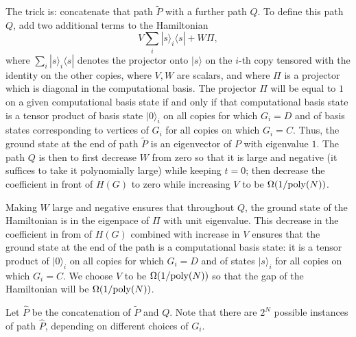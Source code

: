 \documentclass[letterpaper,onecolumn]{quantumarticle}
\newcommand{\poly}{{\rm poly}}
\begin{document}
The trick is: concatenate that path $\tilde P$ with a further path $Q$.  To define this path $Q$, add two additional terms to the Hamiltonian
$$V\sum_i |s\rangle_i\langle s| +W \Pi,$$
where $\sum_i |s\rangle_i\langle s|$ denotes the projector onto $|s\rangle$ on the $i$-th copy tensored with the identity on the other copies, where $V,W$ are scalars, and where $\Pi$ is a projector which is diagonal in the computational basis.
The projector $\Pi$ will be equal to $1$ on a given computational basis state if and only if that computational basis state is a tensor product of basis state $|0\rangle_i$ on all copies for which $G_i=D$ and of basis states corresponding to vertices of $G_i$ for all copies on which $G_i=C$.
Thus, the ground state at the end of path $\tilde P$ is an eigenvector of $P$ with eigenvalue $1$.
The  path $Q$ is then to first decrease $W$ from zero so that it is large and negative (it suffices to take it polynomially large) while keeping $t=0$; then decrease the coefficient in front of $H(G)$ to zero while increasing $V$ to be $\Omega(1/\poly(N))$.  

Making $W$ large and negative ensures that throughout $Q$,
the ground state of the Hamiltonian is in the eigenpace of $\Pi$ with unit eigenvalue.
This decrease in the coefficient in from of $H(G)$ combined with increase in $V$ ensures that the ground state at the end of the path is a computational basis state: it is a tensor product of 
$|0\rangle_i$ on all copies for which $G_i=D$ and of states $|s\rangle_i$ for all copies on which $G_i=C$.
We choose $V$ to be $\Omega(1/\poly(N))$ so that the gap of the Hamiltonian will be $\Omega(1/\poly(N))$.

Let $\hat P$ be the concatenation of $\tilde P$ and $Q$.  Note that there are $2^N$ possible instances of path $\hat P$, depending on different choices of $G_i$.
\end{document}
